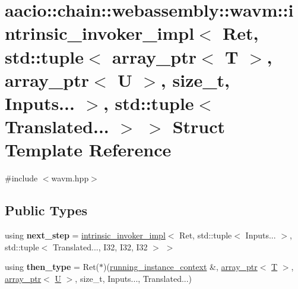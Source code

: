 \hypertarget{structaacio_1_1chain_1_1webassembly_1_1wavm_1_1intrinsic__invoker__impl_3_01_ret_00_01std_1_1tup57488daa8dd7568bbd75b88a50d7b22c}{}\section{aacio\+:\+:chain\+:\+:webassembly\+:\+:wavm\+:\+:intrinsic\+\_\+invoker\+\_\+impl$<$ Ret, std\+:\+:tuple$<$ array\+\_\+ptr$<$ T $>$, array\+\_\+ptr$<$ U $>$, size\+\_\+t, Inputs... $>$, std\+:\+:tuple$<$ Translated... $>$ $>$ Struct Template Reference}
\label{structaacio_1_1chain_1_1webassembly_1_1wavm_1_1intrinsic__invoker__impl_3_01_ret_00_01std_1_1tup57488daa8dd7568bbd75b88a50d7b22c}


{\ttfamily \#include $<$wavm.\+hpp$>$}

\subsection*{Public Types}
\begin{DoxyCompactItemize}
\item 
\mbox{\label{structaacio_1_1chain_1_1webassembly_1_1wavm_1_1intrinsic__invoker__impl_3_01_ret_00_01std_1_1tup57488daa8dd7568bbd75b88a50d7b22c_a059a5797c2345d557fafef281d3048dd}} 
using {\bfseries next\+\_\+step} = \mbox{\hyperlink{structaacio_1_1chain_1_1webassembly_1_1wavm_1_1intrinsic__invoker__impl}{intrinsic\+\_\+invoker\+\_\+impl}}$<$ Ret, std\+::tuple$<$ Inputs... $>$, std\+::tuple$<$ Translated..., I32, I32, I32 $>$ $>$
\item 
\mbox{\label{structaacio_1_1chain_1_1webassembly_1_1wavm_1_1intrinsic__invoker__impl_3_01_ret_00_01std_1_1tup57488daa8dd7568bbd75b88a50d7b22c_a0d0ecd688d49fed1a597e6aa2a883b9c}} 
using {\bfseries then\+\_\+type} = Ret($\ast$)(\mbox{\hyperlink{structaacio_1_1chain_1_1webassembly_1_1wavm_1_1running__instance__context}{running\+\_\+instance\+\_\+context}} \&, \mbox{\hyperlink{structaacio_1_1chain_1_1array__ptr}{array\+\_\+ptr}}$<$ \mbox{\hyperlink{struct_t}{T}} $>$, \mbox{\hyperlink{structaacio_1_1chain_1_1array__ptr}{array\+\_\+ptr}}$<$ \mbox{\hyperlink{union_u}{U}} $>$, size\+\_\+t, Inputs..., Translated...)
\end{DoxyCompactItemize}
